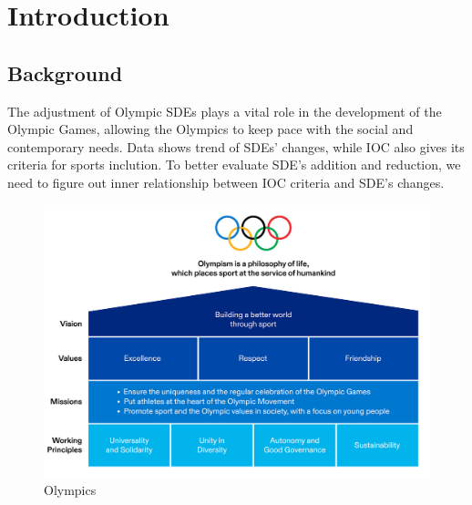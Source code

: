 \documentclass[a4paper]{article}
\begin{document}
\tableofcontents
\section{Introduction}

\subsection{Background}  
The adjustment of Olympic SDEs plays a vital role in the development of the Olympic Games, allowing the Olympics to keep pace with the social and contemporary needs. Data shows trend of SDEs' changes, while IOC also gives its criteria for sports inclution. To better evaluate SDE's addition and reduction, we need to figure out inner relationship between IOC criteria and SDE's changes.
\begin{figure}[htbp]
    \centering
    \includegraphics[width=14cm]{graph 2.png}
    \caption{Olympics}
\end{figure}
\end{document}
